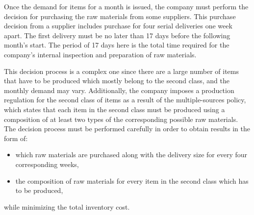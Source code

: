 \documentclass[preprint, 3p,
authoryear]{elsarticle} %
\providecommand{\tightlist}{%
  \setlength{\itemsep}{0pt}\setlength{\parskip}{0pt}}
\begin{document}
Once the demand for items for a month is issued, the company must
perform the decision for purchasing the raw materials from some
suppliers. This purchase decision from a supplier includes purchase for
four serial deliveries one week apart. The first delivery must be no
later than 17 days before the following month's start. The period of 17
days here is the total time required for the company's internal
inspection and preparation of raw materials.

This decision process is a complex one since there are a large number of
items that have to be produced which mostly belong to the second class,
and the monthly demand may vary. Additionally, the company imposes a
production regulation for the second class of items as a result of the
multiple-sources policy, which states that each item in the second class
must be produced using a composition of at least two types of the
corresponding possible raw materials. The decision process must be
performed carefully in order to obtain results in the form of:

\begin{itemize}
\tightlist
\item
  which raw materials are purchased along with the delivery size for
  every four corresponding weeks,
\item
  the composition of raw materials for every item in the second class
  which has to be produced,
\end{itemize}

\setlength{\parindent}{0pt} while minimizing the total inventory cost.

\setlength{\parindent}{10pt}
\end{document}
